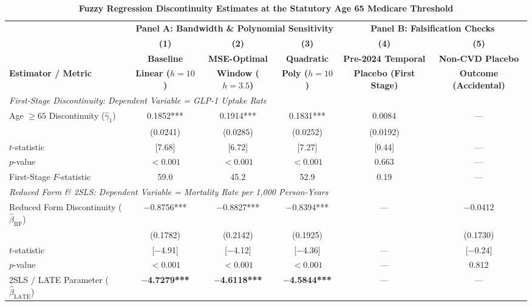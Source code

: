 \documentclass[11pt,a4paper]{article}
\begin{document}
\begin{table}[htbp]
\centering
\small
\caption{\textbf{Fuzzy Regression Discontinuity Estimates at the Statutory Age 65 Medicare Threshold}}
\label{tab:rdd}
\setlength{\tabcolsep}{4pt}
\begin{adjustbox}{max width=\textwidth}
\begin{tabular}{lccccc}
\toprule
 & \multicolumn{3}{c}{\textbf{Panel A: Bandwidth \& Polynomial Sensitivity}} & \multicolumn{2}{c}{\textbf{Panel B: Falsification Checks}} \\
\cmidrule(lr){2-4} \cmidrule(lr){5-6}
 & \textbf{(1)} & \textbf{(2)} & \textbf{(3)} & \textbf{(4)} & \textbf{(5)} \\
 & \textbf{Baseline} & \textbf{MSE-Optimal} & \textbf{Quadratic} & \textbf{Pre-2024 Temporal} & \textbf{Non-CVD Placebo} \\
\textbf{Estimator / Metric} & \textbf{Linear ($h=10$)} & \textbf{Window ($h=3.5$)} & \textbf{Poly ($h=10$)} & \textbf{Placebo (First Stage)} & \textbf{Outcome (Accidental)} \\
\midrule
\multicolumn{6}{l}{\textit{First-Stage Discontinuity: Dependent Variable = GLP-1 Uptake Rate}} \\
\addlinespace[0.2em]
Age $\ge 65$ Discontinuity ($\hat{\gamma}_1$) & 0.1852*** & 0.1914*** & 0.1831*** & 0.0084 & --- \\
 & (0.0241) & (0.0285) & (0.0252) & (0.0192) &  \\
$t$-statistic & [7.68] & [6.72] & [7.27] & [0.44] & --- \\
$p$-value & $< 0.001$ & $< 0.001$ & $< 0.001$ & 0.663 & --- \\
First-Stage $F$-statistic & 59.0 & 45.2 & 52.9 & 0.19 & --- \\
\midrule
\multicolumn{6}{l}{\textit{Reduced Form \& 2SLS: Dependent Variable = Mortality Rate per 1,000 Person-Years}} \\
\addlinespace[0.2em]
Reduced Form Discontinuity ($\hat{\beta}_{\text{RF}}$) & $-$0.8756*** & $-$0.8827*** & $-$0.8394*** & --- & $-$0.0412 \\
 & (0.1782) & (0.2142) & (0.1925) &  & (0.1730) \\
$t$-statistic & [$-$4.91] & [$-$4.12] & [$-$4.36] & --- & [$-$0.24] \\
$p$-value & $< 0.001$ & $< 0.001$ & $< 0.001$ & --- & 0.812 \\
\addlinespace[0.3em]
2SLS / LATE Parameter ($\hat{\beta}_{\text{LATE}}$) & \textbf{$-$4.7279***} & \textbf{$-$4.6118***} & \textbf{$-$4.5844***} & --- & --- \\

\end{tabular}
\end{adjustbox}
\end{table}
\end{document}
